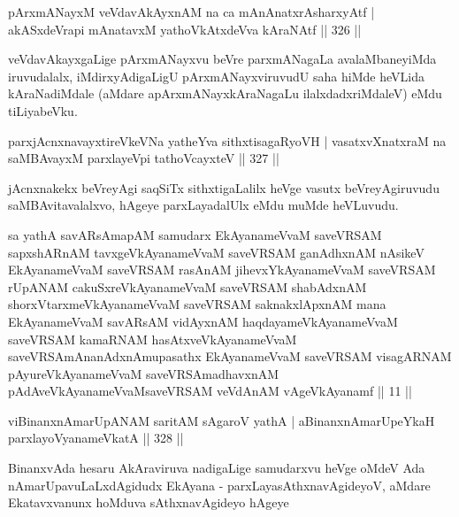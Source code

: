 \begin{shl}
pArxmANayxM veVdavAkAyxnAM na ca mAnAnatxrAsharxyAtf |
akASxdeVrapi mAnatavxM yathoVkAtxdeVva kAraNAtf \hfill || 326 ||
\end{shl}

\begin{artha}
veVdavAkayxgaLige pArxmANayxvu beVre parxmANagaLa avalaMbaneyiMda iruvudalalx, iMdirxyAdigaLigU pArxmANayxviruvudU saha hiMde heVLida kAraNadiMdale (aMdare apArxmANayxkAraNagaLu ilalxdadxriMdaleV) eMdu tiLiyabeVku.
\end{artha}


\begin{shl}
parxjAcnxnavayxtireVkeVNa yatheYva sithxtisagaRyoVH |
vasatxvXnatxraM na saMBAvayxM parxlayeV\s pi tathoVcayxteV \hfill || 327 ||
\end{shl}

\begin{artha}
jAcnxnakekx beVreyAgi saqSiTx sithxtigaLalilx heVge vasutx beVreyAgiruvudu saMBAvitavalalxvo, hAgeye parxLayadalUlx eMdu muMde heVLuvudu.
\end{artha}


\begin{kandikeshl}
sa yathA savARsAmapAM samudarx EkAyanameVvaM saveVRSAM sapxshARnAM tavxgeVkAyanameVvaM saveVRSAM ganAdhxnAM nAsikeV EkAyanameVvaM saveVRSAM rasAnAM jihevxYkAyanameVvaM saveVRSAM rUpANAM cakuSxreVkAyanameVvaM saveVRSAM shabAdxnAM shorxVtarxmeVkAyanameVvaM saveVRSAM saknakxlApxnAM mana EkAyanameVvaM savARsAM vidAyxnAM haqdayameVkAyanameVvaM saveVRSAM kamaRNAM hasAtxveVkAyanameVvaM saveVRSAmAnanAdxnAmupasathx EkAyanameVvaM saveVRSAM visagARNAM pAyureVkAyanameVvaM saveVRSAmadhavxnAM pAdAveVkAyanameVvaM\break saveVRSAM veVdAnAM vAgeVkAyanamf || 11 || 
\end{kandikeshl}

\begin{shl}
viBinanxnAmarUpANAM saritAM sAgaroV yathA |
aBinanxnAmarUpeYkaH parxlayoV\s yanameVkatA \hfill || 328 ||
\end{shl}

\begin{artha}
BinanxvAda hesaru AkAraviruva nadigaLige samudarxvu heVge oMdeV Ada nAmarUpavuLaLxdAgidudx EkAyana - parxLayasAthxnavAgideyoV, aMdare Ekatavxvanunx hoMduva sAthxnavAgideyo hAgeye
\end{artha}

